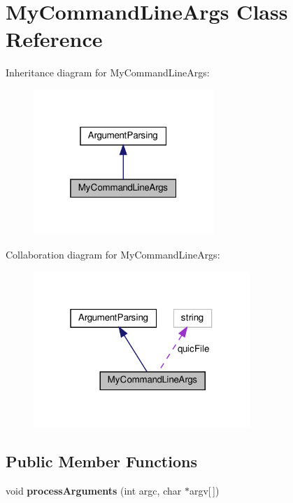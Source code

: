 \hypertarget{classMyCommandLineArgs}{}\section{My\+Command\+Line\+Args Class Reference}
\label{classMyCommandLineArgs}


Inheritance diagram for My\+Command\+Line\+Args\+:
\nopagebreak
\begin{figure}[H]
\begin{center}
\leavevmode
\includegraphics[width=193pt]{classMyCommandLineArgs__inherit__graph}
\end{center}
\end{figure}


Collaboration diagram for My\+Command\+Line\+Args\+:
\nopagebreak
\begin{figure}[H]
\begin{center}
\leavevmode
\includegraphics[width=232pt]{classMyCommandLineArgs__coll__graph}
\end{center}
\end{figure}
\subsection*{Public Member Functions}
\begin{DoxyCompactItemize}
\item 
\mbox{\label{classMyCommandLineArgs_a4319e9c42c614a8c23f48252a8a35bd4}} 
void {\bfseries process\+Arguments} (int argc, char $\ast$argv\mbox{[}$\,$\mbox{]})
\end{DoxyCompactItemize}
